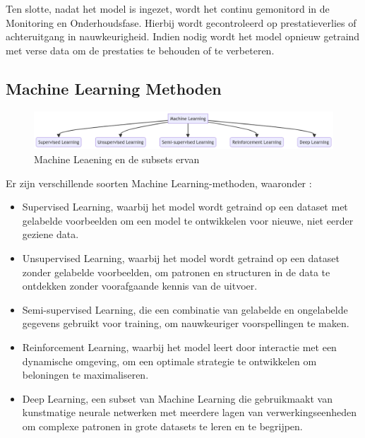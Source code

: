 Ten slotte, nadat het model is ingezet, wordt het continu gemonitord in de Monitoring en Onderhoudsfase. Hierbij wordt gecontroleerd op prestatieverlies of achteruitgang in nauwkeurigheid. Indien nodig wordt het model opnieuw getraind met verse data om de prestaties te behouden of te verbeteren\autocite{Schlegel2022}.

\subsection{Machine Learning Methoden}

\begin{figure}[h]
    \includegraphics[width=\linewidth]{mm.png}
    \caption{Machine Leaening en de subsets ervan}
    \label{fig:ML_subsets}
\end{figure}

Er zijn verschillende soorten Machine Learning-methoden, waaronder \autocite{Mahesh2019}:
\begin{itemize}
    \item Supervised Learning, waarbij het model wordt getraind op een dataset met gelabelde voorbeelden om een model te ontwikkelen voor nieuwe, niet eerder geziene data.

    \item Unsupervised Learning, waarbij het model wordt getraind op een dataset zonder gelabelde voorbeelden, om patronen en structuren in de data te ontdekken zonder voorafgaande kennis van de uitvoer.

    \item Semi-supervised Learning, die een combinatie van gelabelde en ongelabelde gegevens gebruikt voor training, om nauwkeuriger voorspellingen te maken.

    \item Reinforcement Learning, waarbij het model leert door interactie met een dynamische omgeving, om een optimale strategie te ontwikkelen om beloningen te maximaliseren.

    \item Deep Learning, een subset van Machine Learning die gebruikmaakt van kunstmatige neurale netwerken met meerdere lagen van verwerkingseenheden om complexe patronen in grote datasets te leren en te begrijpen.
\end{itemize}


